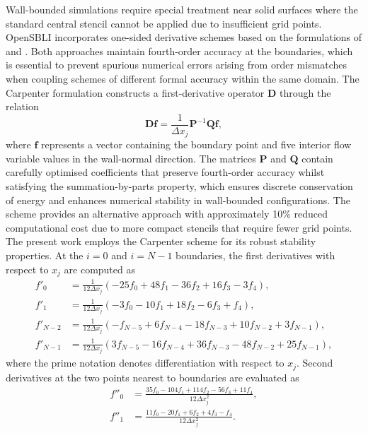 Wall-bounded simulations require special treatment near solid surfaces where the standard central stencil cannot be applied due to insufficient grid points. OpenSBLI incorporates one-sided derivative schemes based on the formulations of \cite{CarpenterNordstromGottlieb1999} and \cite{Ekaterinaris2005}. Both approaches maintain fourth-order accuracy at the boundaries, which is essential to prevent spurious numerical errors arising from order mismatches when coupling schemes of different formal accuracy within the same domain. The Carpenter formulation constructs a first-derivative operator $\mathbf{D}$ through the relation
\begin{equation}
    \mathbf{D}\mathbf{f} = \frac{1}{\Delta x_j} \mathbf{P}^{-1} \mathbf{Q} \mathbf{f},
\end{equation}
where $\mathbf{f}$ represents a vector containing the boundary point and five interior flow variable values in the wall-normal direction. The matrices $\mathbf{P}$ and $\mathbf{Q}$ contain carefully optimised coefficients that preserve fourth-order accuracy whilst satisfying the summation-by-parts property, which ensures discrete conservation of energy and enhances numerical stability in wall-bounded configurations. The \cite{Ekaterinaris2005} scheme provides an alternative approach with approximately 10\% reduced computational cost due to more compact stencils that require fewer grid points. The present work employs the Carpenter scheme for its robust stability properties. At the $i=0$ and $i=N-1$ boundaries, the first derivatives with respect to $x_j$ are computed as \begin{align}
    f'_0 &= \frac{1}{12\Delta x_j} \left(-25 f_0 + 48 f_1 - 36 f_2 + 16 f_3 - 3 f_4\right), \\[0.8em]
    f'_1 &= \frac{1}{12\Delta x_j} \left(-3 f_0 - 10 f_1 + 18 f_2 - 6 f_3 + f_4\right), \\[0.8em]
    f'_{N-2} &= \frac{1}{12\Delta x_j} \left(-f_{N-5} + 6 f_{N-4} - 18 f_{N-3} + 10 f_{N-2} + 3 f_{N-1}\right), \\[0.8em]
    f'_{N-1} &= \frac{1}{12\Delta x_j} \left(3 f_{N-5} - 16 f_{N-4} + 36 f_{N-3} - 48 f_{N-2} + 25 f_{N-1}\right),
\end{align}
where the prime notation denotes differentiation with respect to $x_j$. Second derivatives at the two points nearest to boundaries are evaluated as
\begin{align}
    f''_0 &= \frac{35 f_0 - 104 f_1 + 114 f_2 - 56 f_3 + 11 f_4}{12\Delta x_j^2}, \\[0.8em]
    f''_1 &= \frac{11 f_0 - 20 f_1 + 6 f_2 + 4 f_3 - f_4}{12\Delta x_j^2}.
\end{align}

